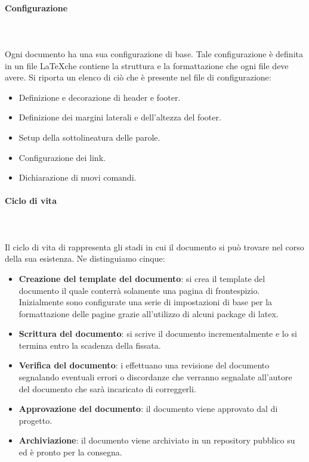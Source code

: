 \documentclass[../norme-di-progetto.tex]{subfiles}
\begin{document}
\paragraph{Configurazione} \mbox{}\\
\label{par:configurazione}
\\Ogni documento ha una sua configurazione di base. Tale configurazione è definita in un file \LaTeX  che contiene la struttura e la formattazione che ogni file deve avere. Si riporta un elenco di ciò che è presente nel file di configurazione:
\begin{itemize}
	\item Definizione e decorazione di header e footer.
	\item Definizione dei margini laterali e dell'altezza del footer.
	\item Setup della sottolineatura delle parole.
	\item Configurazione dei link.
	\item Dichiarazione di nuovi comandi.
\end{itemize}
\paragraph{Ciclo di vita}\mbox{}\\
\label{par:ciclo di vita}
\\Il ciclo di vita di rappresenta gli stadi in cui il documento si può trovare nel corso della sua esistenza. Ne distinguiamo cinque:
\begin{itemize}
	\item \textbf{Creazione del template del documento}: si crea il template del documento il quale conterrà solamente una pagina di frontespizio. Inizialmente sono configurate una serie di impostazioni di base per la formattazione delle pagine grazie all'utilizzo di alcuni package di latex.
	\item \textbf{Scrittura del documento}: si scrive il documento incrementalmente e lo si termina entro la scadenza della  fissata.
	\item \textbf{Verifica del documento}: i  effettuano una revisione del documento segnalando eventuali errori o discordanze che verranno segnalate all'autore del documento che sarà incaricato di correggerli.
	\item \textbf{Approvazione del documento}: il documento viene approvato dal  di progetto.
	\item \textbf{Archiviazione}: il documento viene archiviato in un repository pubblico su  ed è pronto per la consegna.
\end{itemize}
\end{document}
